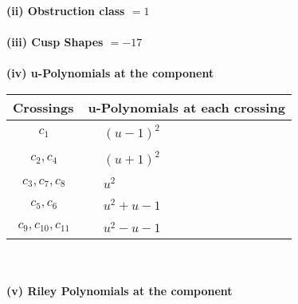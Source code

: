 \documentclass[1p]{elsarticle_modified}
\theoremstyle{definition}
\begin{document}
\flushleft \textbf{(ii) Obstruction class $= 1$}\\~\\
\flushleft \textbf{(iii) Cusp Shapes $= -17$}\\~\\
\newpage\renewcommand{\arraystretch}{1}
\flushleft \textbf{(iv) u-Polynomials at the component}\newline \\
\begin{tabular}{m{50pt}|m{274pt}}
Crossings & \hspace{64pt}u-Polynomials at each crossing \\
\hline $$\begin{aligned}c_{1}\end{aligned}$$&$\begin{aligned}
&(u-1)^2
\end{aligned}$\\
\hline $$\begin{aligned}c_{2},c_{4}\end{aligned}$$&$\begin{aligned}
&(u+1)^2
\end{aligned}$\\
\hline $$\begin{aligned}c_{3},c_{7},c_{8}\end{aligned}$$&$\begin{aligned}
&u^2
\end{aligned}$\\
\hline $$\begin{aligned}c_{5},c_{6}\end{aligned}$$&$\begin{aligned}
&u^2+u-1
\end{aligned}$\\
\hline $$\begin{aligned}c_{9},c_{10},c_{11}\end{aligned}$$&$\begin{aligned}
&u^2- u-1
\end{aligned}$\\
\hline
\end{tabular}\\~\\
\newpage\renewcommand{\arraystretch}{1}
\flushleft \textbf{(v) Riley Polynomials at the component}\newline \\
\end{document}
